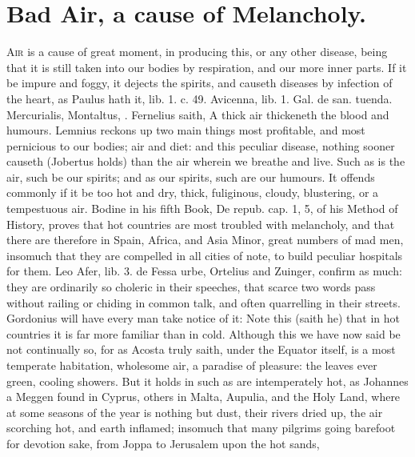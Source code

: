 {{%
\section{Bad Air, a cause of Melancholy.}

\lettrine{A}{ir} is a cause of great moment, in producing this, or any other
disease, being that it is still taken into our bodies by respiration,
and our more inner parts. If it be impure and foggy, it dejects
the spirits, and causeth diseases by infection of the heart, as Paulus
hath it, lib. 1. c. 49. Avicenna, lib. 1. Gal. de san. tuenda.
Mercurialis, Montaltus, \etc{}. Fernelius saith, A thick air
thickeneth the blood and humours. Lemnius reckons up two main
things most profitable, and most pernicious to our bodies; air and
diet: and this peculiar disease, nothing sooner causeth (Jobertus
holds) than the air wherein we breathe and live. Such as is the
air, such be our spirits; and as our spirits, such are our humours. It
offends commonly if it be too hot and dry, thick, fuliginous,
cloudy, blustering, or a tempestuous air. Bodine in his fifth Book, De
repub. cap. 1, 5, of his Method of History, proves that hot countries
are most troubled with melancholy, and that there are therefore in
Spain, Africa, and Asia Minor, great numbers of mad men, insomuch that
they are compelled in all cities of note, to build peculiar hospitals
for them. Leo Afer, lib. 3. de Fessa urbe, Ortelius and Zuinger,
confirm as much: they are ordinarily so choleric in their speeches,
that scarce two words pass without railing or chiding in common talk,
and often quarrelling in their streets. Gordonius will have every
man take notice of it: Note this (saith he) that in hot countries it is
far more familiar than in cold. Although this we have now said be not
continually so, for as Acosta truly saith, under the Equator
itself, is a most temperate habitation, wholesome air, a paradise of
pleasure: the leaves ever green, cooling showers. But it holds in such
as are intemperately hot, as Johannes a Meggen found in Cyprus,
others in Malta, Aupulia, and the Holy Land, where at some
seasons of the year is nothing but dust, their rivers dried up, the air
scorching hot, and earth inflamed; insomuch that many pilgrims going
barefoot for devotion sake, from Joppa to Jerusalem upon the hot sands,
}}
